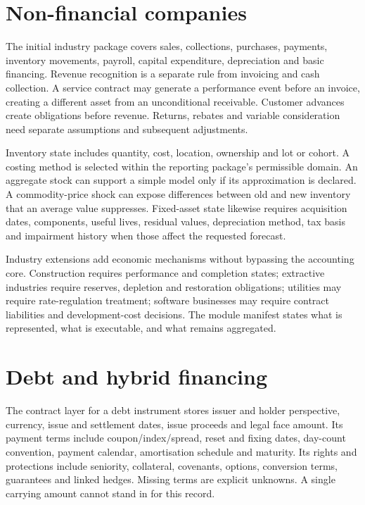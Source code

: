 \section{Non-financial companies}

The initial industry package covers sales, collections, purchases, payments,
inventory movements, payroll, capital expenditure, depreciation and basic
financing. Revenue recognition is a separate rule from invoicing and cash
collection. A service contract may generate a performance event before an
invoice, creating a different asset from an unconditional receivable. Customer
advances create obligations before revenue. Returns, rebates and variable
consideration need separate assumptions and subsequent adjustments.

Inventory state includes quantity, cost, location, ownership and lot or cohort.
A costing method is selected within the reporting package's permissible
domain. An aggregate stock can support a simple model only if its approximation
is declared. A commodity-price shock can expose differences between old and
new inventory that an average value suppresses. Fixed-asset state likewise
requires acquisition dates, components, useful lives, residual values,
depreciation method, tax basis and impairment history when those affect the
requested forecast.

Industry extensions add economic mechanisms without bypassing the accounting
core. Construction requires performance and completion states; extractive
industries require reserves, depletion and restoration obligations; utilities
may require rate-regulation treatment; software businesses may require
contract liabilities and development-cost decisions. The module manifest
states what is represented, what is executable, and what remains aggregated.

\section{Debt and hybrid financing}

The contract layer for a debt instrument stores issuer and holder perspective,
currency, issue and settlement dates, issue proceeds and legal face amount.
Its payment terms include coupon/index/spread, reset and fixing dates,
day-count convention, payment calendar, amortisation schedule and maturity.
Its rights and protections include seniority, collateral, covenants, options,
conversion terms, guarantees and linked hedges. Missing terms are
explicit unknowns. A single carrying amount cannot stand in for this record.

